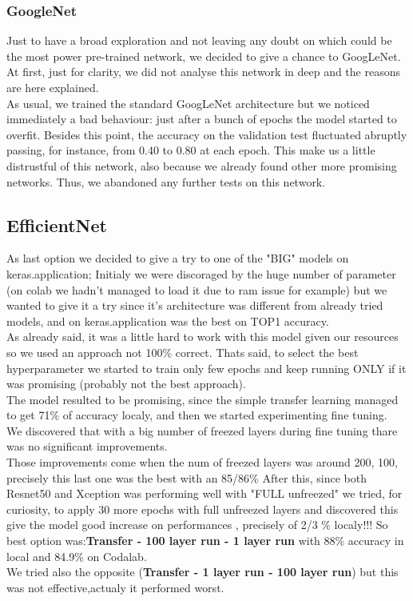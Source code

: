 \documentclass[10pt]{article}
\begin{document}
\subsubsection{GoogleNet}
Just to have a broad exploration and not leaving any doubt on which could be the most power pre-trained network, we decided to give a chance to GoogLeNet. At first, just for clarity, we did not analyse this network in deep and the reasons are here explained.\\[0.1cm]
As usual, we trained the standard GoogLeNet architecture but we noticed immediately a bad behaviour: just after a bunch of epochs the model started to overfit. Besides this point, the accuracy on the validation test fluctuated abruptly passing, for instance, from 0.40 to 0.80 at each epoch. This make us a little distrustful of this network, also because we already found other more promising networks. Thus, we abandoned any further tests on this network.
\subsection{EfficientNet}
As last option we decided to give a try to one of the "BIG" models on keras.application;
Initialy we were discoraged by the huge number of parameter (on colab we hadn't managed to load it due to ram issue for example)
but we wanted to give it a try since it's architecture was different from already tried models, and on keras.application was the best on TOP1 accuracy.\\
As already said, it was a little hard to work with this model given our resources so we used an approach not 100\% correct.
Thats said, to select the best hyperparameter we started to train only few epochs and keep running ONLY if it was promising (probably not the best approach).\\
The model resulted to be promising, since the simple transfer learning managed to get 71\% of accuracy localy, and then we started experimenting fine tuning.\\
We discovered that with a big number of freezed layers during fine tuning thare was no significant improvements.\\
Those improvements come when the num of freezed layers was around 200, 100, precisely this last one was the best with an 85/86\% 
After this, since both Resnet50 and Xception was performing well with "FULL unfreezed" we tried, for curiosity, to apply 30 more epochs with full unfreezed layers and discovered this give the model good increase on performances , precisely of 2/3 \% localy!!!
So best option was:\textbf{Transfer - 100 layer run - 1 layer run} with 88\% accuracy in local and 84.9\% on Codalab.\\
We tried also the opposite (\textbf{Transfer - 1 layer run - 100 layer run}) but this was not effective,actualy it performed worst.
\end{document}
